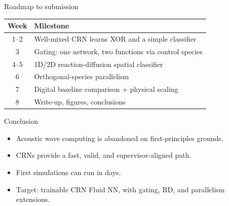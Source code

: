\documentclass[aspectratio=169,11pt]{beamer}
\begin{document}
\begin{frame}{Roadmap to submission}

\begin{table}
\centering
\begin{tabular}{cl}
\toprule
\textbf{Week} & \textbf{Milestone} \\
\midrule
1--2  & Well-mixed CRN learns XOR and a simple classifier \\
3     & Gating: one network, two functions via control species \\
4--5  & 1D/2D reaction-diffusion spatial classifier \\
6     & Orthogonal-species parallelism \\
7     & Digital baseline comparison + physical scaling \\
8     & Write-up, figures, conclusions \\
\bottomrule
\end{tabular}
\end{table}

\end{frame}

\begin{frame}{Conclusion}

\begin{itemize}
    \item Acoustic wave computing is abandoned on first-principles grounds.
    \item CRNs provide a fast, valid, and supervisor-aligned path.
    \item First simulations can run in days.
    \item Target: trainable CRN Fluid NN, with gating, RD, and parallelism extensions.
\end{itemize}

\end{frame}
\end{document}
